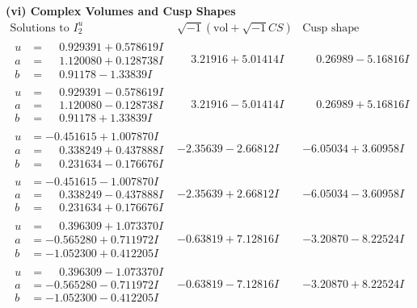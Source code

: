 \documentclass[1p]{elsarticle_modified}
\theoremstyle{definition}
\newcommand{\I}{\sqrt{-1}}
\begin{document}
\newpage\flushleft \textbf{(vi) Complex Volumes and Cusp Shapes}
$$\begin{array}{c|c|c}  
\text{Solutions to }I^u_{2}& \I (\text{vol} + \sqrt{-1}CS) & \text{Cusp shape}\\
 \hline 
\begin{aligned}
u &= \phantom{-}0.929391 + 0.578619 I \\
a &= \phantom{-}1.120080 + 0.128738 I \\
b &= \phantom{-}0.91178 - 1.33839 I\end{aligned}
 & \phantom{-}3.21916 + 5.01414 I & \phantom{-}0.26989 - 5.16816 I \\ \hline\begin{aligned}
u &= \phantom{-}0.929391 - 0.578619 I \\
a &= \phantom{-}1.120080 - 0.128738 I \\
b &= \phantom{-}0.91178 + 1.33839 I\end{aligned}
 & \phantom{-}3.21916 - 5.01414 I & \phantom{-}0.26989 + 5.16816 I \\ \hline\begin{aligned}
u &= -0.451615 + 1.007870 I \\
a &= \phantom{-}0.338249 + 0.437888 I \\
b &= \phantom{-}0.231634 - 0.176676 I\end{aligned}
 & -2.35639 - 2.66812 I & -6.05034 + 3.60958 I \\ \hline\begin{aligned}
u &= -0.451615 - 1.007870 I \\
a &= \phantom{-}0.338249 - 0.437888 I \\
b &= \phantom{-}0.231634 + 0.176676 I\end{aligned}
 & -2.35639 + 2.66812 I & -6.05034 - 3.60958 I \\ \hline\begin{aligned}
u &= \phantom{-}0.396309 + 1.073370 I \\
a &= -0.565280 + 0.711972 I \\
b &= -1.052300 + 0.412205 I\end{aligned}
 & -0.63819 + 7.12816 I & -3.20870 - 8.22524 I \\ \hline\begin{aligned}
u &= \phantom{-}0.396309 - 1.073370 I \\
a &= -0.565280 - 0.711972 I \\
b &= -1.052300 - 0.412205 I\end{aligned}
 & -0.63819 - 7.12816 I & -3.20870 + 8.22524 I \\ \hline\begin{aligned}

\end{aligned}
\end{array}$$
\end{document}
